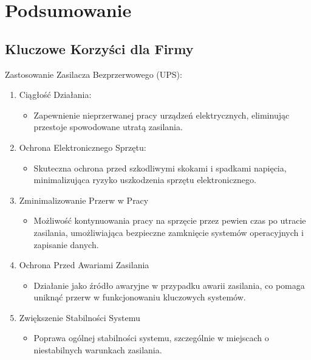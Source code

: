 \section{Podsumowanie}
\subsection{Kluczowe Korzyści dla Firmy}

    Zastosowanie Zasilacza Bezprzerwowego (UPS):


    \begin{enumerate}

        \item Ciągłość Działania:
            \begin{itemize}
                \item Zapewnienie nieprzerwanej pracy urządzeń elektrycznych, eliminując przestoje spowodowane utratą
                zasilania.
            \end{itemize}


        \item Ochrona Elektronicznego Sprzętu:      
            \begin{itemize}
                \item Skuteczna ochrona przed szkodliwymi skokami i spadkami napięcia, minimalizująca ryzyko
                uszkodzenia sprzętu elektronicznego.
            \end{itemize}


        \item Zminimalizowanie Przerw w Pracy
            \begin{itemize}
                \item Możliwość kontynuowania pracy na sprzęcie przez pewien czas po utracie zasilania, umożliwiająca
                bezpieczne zamknięcie systemów operacyjnych i zapisanie danych.
            \end{itemize}

        \item Ochrona Przed Awariami Zasilania
            \begin{itemize}
                \item Działanie jako źródło awaryjne w przypadku awarii zasilania, co pomaga uniknąć przerw w
                funkcjonowaniu kluczowych systemów.
            \end{itemize}

        \item Zwiększenie Stabilności Systemu
            \begin{itemize}
                \item Poprawa ogólnej stabilności systemu, szczególnie w miejscach o niestabilnych warunkach zasilania.
            \end{itemize}


\end{enumerate}
